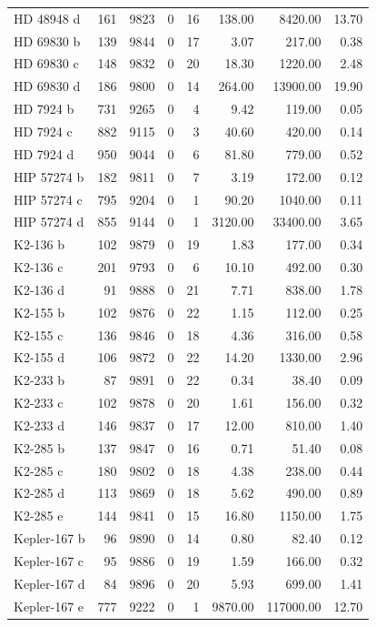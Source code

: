 \begin{table}
\begin{tabular}{lrrrrrrr}
HD 48948 d & 161 & 9823 & 0 & 16 & 138.00 & 8420.00 & 13.70 \\
HD 69830 b & 139 & 9844 & 0 & 17 & 3.07 & 217.00 & 0.38 \\
HD 69830 c & 148 & 9832 & 0 & 20 & 18.30 & 1220.00 & 2.48 \\
HD 69830 d & 186 & 9800 & 0 & 14 & 264.00 & 13900.00 & 19.90 \\
HD 7924 b & 731 & 9265 & 0 & 4 & 9.42 & 119.00 & 0.05 \\
HD 7924 c & 882 & 9115 & 0 & 3 & 40.60 & 420.00 & 0.14 \\
HD 7924 d & 950 & 9044 & 0 & 6 & 81.80 & 779.00 & 0.52 \\
HIP 57274 b & 182 & 9811 & 0 & 7 & 3.19 & 172.00 & 0.12 \\
HIP 57274 c & 795 & 9204 & 0 & 1 & 90.20 & 1040.00 & 0.11 \\
HIP 57274 d & 855 & 9144 & 0 & 1 & 3120.00 & 33400.00 & 3.65 \\
K2-136 b & 102 & 9879 & 0 & 19 & 1.83 & 177.00 & 0.34 \\
K2-136 c & 201 & 9793 & 0 & 6 & 10.10 & 492.00 & 0.30 \\
K2-136 d & 91 & 9888 & 0 & 21 & 7.71 & 838.00 & 1.78 \\
K2-155 b & 102 & 9876 & 0 & 22 & 1.15 & 112.00 & 0.25 \\
K2-155 c & 136 & 9846 & 0 & 18 & 4.36 & 316.00 & 0.58 \\
K2-155 d & 106 & 9872 & 0 & 22 & 14.20 & 1330.00 & 2.96 \\
K2-233 b & 87 & 9891 & 0 & 22 & 0.34 & 38.40 & 0.09 \\
K2-233 c & 102 & 9878 & 0 & 20 & 1.61 & 156.00 & 0.32 \\
K2-233 d & 146 & 9837 & 0 & 17 & 12.00 & 810.00 & 1.40 \\
K2-285 b & 137 & 9847 & 0 & 16 & 0.71 & 51.40 & 0.08 \\
K2-285 c & 180 & 9802 & 0 & 18 & 4.38 & 238.00 & 0.44 \\
K2-285 d & 113 & 9869 & 0 & 18 & 5.62 & 490.00 & 0.89 \\
K2-285 e & 144 & 9841 & 0 & 15 & 16.80 & 1150.00 & 1.75 \\
Kepler-167 b & 96 & 9890 & 0 & 14 & 0.80 & 82.40 & 0.12 \\
Kepler-167 c & 95 & 9886 & 0 & 19 & 1.59 & 166.00 & 0.32 \\
Kepler-167 d & 84 & 9896 & 0 & 20 & 5.93 & 699.00 & 1.41 \\
Kepler-167 e & 777 & 9222 & 0 & 1 & 9870.00 & 117000.00 & 12.70 \\

\end{tabular}
\end{table}
